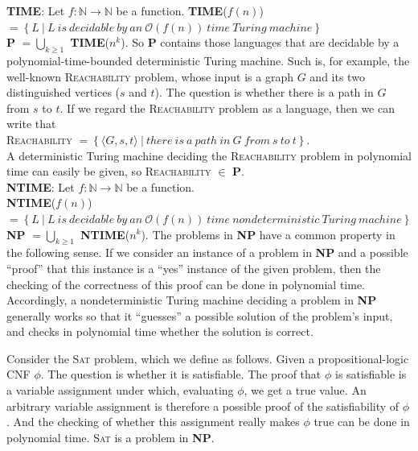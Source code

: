 \documentclass[margin=0px]{article}
\begin{document}
\noindent \textbf{TIME}: Let $f : \mathbb{N} \to \mathbb{N}$ be a function. \textbf{TIME}($f(n)$) $= \left\{L \ | \ L \ is \ decidable \ by \ an \ \mathcal{O}(f(n)) \ time \ Turing \ machine \right\}$\\

\noindent \textbf{P} $=\bigcup_{k \geq 1}$ \textbf{TIME}($n^{k}$). So \textbf{P} contains those languages
that are decidable by a polynomial-time-bounded deterministic Turing machine. Such is, for example, the well-known \textsc{Reachability}
problem, whose input is a graph $G$ and its two distinguished vertices ($s$ and $t$). The question is whether there is a
path in $G$ from $s$ to $t$. If we regard the \textsc{Reachability} problem as a language, then we can write that\\

\textsc{Reachability} $= \left\{\langle G, s, t \rangle \ | \ there \ is \ a \ path \ in \ G \ from \ s \ to \ t\right\}$.\\

A deterministic Turing machine deciding the \textsc{Reachability} problem in polynomial time can easily be given, so
\textsc{Reachability} $\in$ \textbf{P}.\\

\noindent \textbf{NTIME}: Let $f : \mathbb{N} \to \mathbb{N}$ be a function.\\ \textbf{NTIME}($f(n)$) $= \left\{L \ | \ L \ is \ decidable \ by \ an \ \mathcal{O}(f(n)) \ time \ nondeterministic \ Turing \ machine \right\}$\\

\noindent \textbf{NP} $=\bigcup_{k \geq 1}$ \textbf{NTIME}($n^{k}$).
The problems in \textbf{NP} have a common property in the following sense.
If we consider an instance of a problem in \textbf{NP} and a possible ``proof''
that this instance is a ``yes'' instance of the given problem,
then the checking of the correctness of this proof can be done in polynomial time.
Accordingly, a nondeterministic Turing machine deciding a problem in \textbf{NP}
generally works so that it ``guesses'' a possible solution of the problem's input,
and checks in polynomial time whether the solution is correct.

Consider the \textsc{Sat} problem, which we define as follows. Given a propositional-logic CNF $\phi$.
The question is whether it is satisfiable. The proof that $\phi$ is satisfiable is a variable assignment
under which, evaluating $\phi$, we get a true value. An arbitrary variable assignment is therefore a possible proof of the
satisfiability of $\phi$. And the checking of whether this
assignment really makes $\phi$ true can be done in polynomial time. \textsc{Sat}
is a problem in \textbf{NP}.\\
\end{document}
